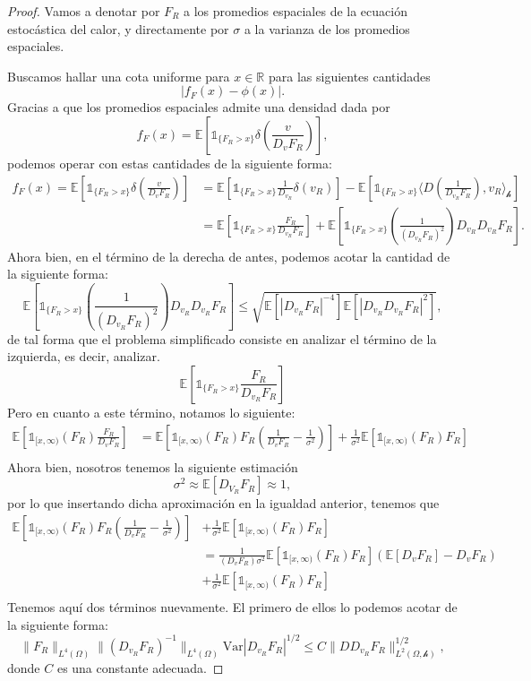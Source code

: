 \documentclass[letterpaper,twoside]{book}
\newcommand{\R}{\mathbb{R}}
\newcommand{\E}{\mathbb{E}}
\newcommand{\1}{\mathds{1}}
\newcommand{\abs}[1]{\left\lvert #1 \right\rvert}
\theoremstyle{definition}
\theoremstyle{definition}
\theoremstyle{definition}
\theoremstyle{definition}
\theoremstyle{definition}
\theoremstyle{definition}
\theoremstyle{definition}
\begin{document}
\begin{proof} 
   Vamos a denotar por $F_R$ a los promedios espaciales de la ecuación estocástica del calor, y directamente por $\sigma$ a la varianza de los promedios espaciales.

   Buscamos hallar una cota uniforme para $x\in \R$ para las siguientes cantidades
   \[
   \abs{f_F(x)-\phi(x)}. 
   \]
   Gracias a que los promedios espaciales admite una densidad dada por 
   \[
   f_F(x)=\E\left[\1_{\{F_R>x\}}\delta(\frac{v}{D_vF_R})\right], 
   \]
   podemos operar con estas cantidades de la siguiente forma:
    \begin{align*}
    f_F(x)=\E\left[\1_{\{F_R>x\}}\delta(\frac{v}{D_vF_R})\right]&=\E\left[\1_{\{F_R>x\}}\frac{1}{D_{v_R}}\delta(v_R)\right]-\E\left[\1_{\{F_R>x\}}\langle D \left(\frac{1}{D_{v_R}F_R}\right),v_R\rangle_{\mathcal{h}}\right]\\
    &=\E\left[\1_{\{F_R>x\}}\frac{F_R}{D_{v_R}F_R}\right]+\E\left[\1_{\{F_R>x\}}\left(\frac{1}{\left(D_{v_R}F_R\right)^2}\right)D_{v_R}D_{v_R}F_R\right].
    \end{align*}
   Ahora bien, en el término de la derecha de antes, podemos acotar la cantidad de la siguiente forma:
   \[
    \E\left[\1_{\{F_R>x\}}\left(\frac{1}{\left(D_{v_R}F_R\right)^2}\right)D_{v_R}D_{v_R}F_R\right]\leq \sqrt{\E\left[\abs{D_{v_R}F_R}^{-4}\right]\E\left[\abs{D_{v_R}D_{v_R}F_R}^2\right]},
   \]
   de tal forma que el problema simplificado consiste en analizar el término de la izquierda, es decir, analizar.
   \[
    \E\left[\1_{\{F_R>x\}}\frac{F_R}{D_{v_R}F_R}\right] 
   \]
    Pero en cuanto a este término, notamos lo siguiente:
   \begin{align*}
    \E\left[\1_{[x,\infty)}(F_R)\frac{F_R}{D_vF_R}\right]&=\E\left[\1_{[x,\infty)}(F_R)F_R \left(\frac{1}{D_vF_R}-\frac{1}{\sigma^2}\right)\right] + \frac{1}{\sigma^2}\E\left[\1_{[x,\infty)}(F_R)F_R\right]\\
   \end{align*}
   Ahora bien, nosotros tenemos la siguiente estimación 
   \[
   \sigma^2\approx \E\left[D_{V_R}F_R\right]\approx 1,  
   \]
   por lo que insertando dicha aproximación en la igualdad anterior, tenemos que 
   \begin{align*}
    \E\left[\1_{[x,\infty)}(F_R)F_R \left(\frac{1}{D_vF_R}-\frac{1}{\sigma^2}\right)\right] &+ \frac{1}{\sigma^2}\E\left[\1_{[x,\infty)}(F_R)F_R\right]\\
    &=\frac{1}{(D_vF_R)\sigma^2}\E\left[\1_{[x,\infty)}(F_R)F_R\right] \left(\E\left[D_vF_R\right]-D_vF_R\right)\\
    &+\frac{1}{\sigma^2}\E\left[\1_{[x,\infty)}(F_R)F_R\right]\\
   \end{align*}
   Tenemos aquí dos términos nuevamente. El primero de ellos lo podemos acotar de la siguiente forma:
   \[
     \|F_R\|_{L^4(\Omega)}\|\left(D_{v_R}F_R\right)^{-1}\|_{L^{4}(\Omega)}\text{Var}\abs{D_{v_R}F_R}^{1/2}\le C\|DD_{v_R}F_R\|^{1/2}_{L^{2}(\Omega,\mathcal{h})},
   \] 
   donde $C$ es una constante adecuada.


\end{proof}
\end{document}
